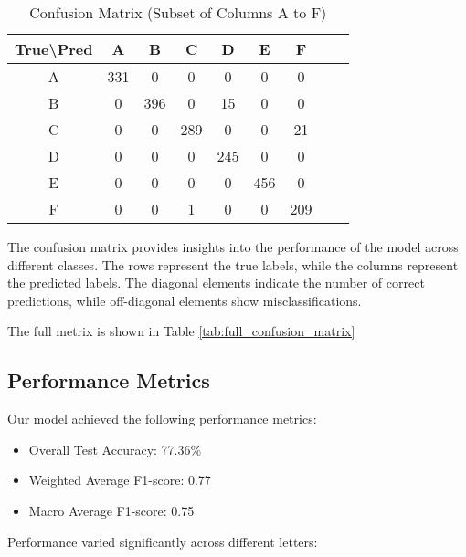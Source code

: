 \documentclass[times,final,english]{revdetua}
\begin{document}
\begin{table}[ht]
\centering
\caption{Confusion Matrix (Subset of Columns A to F)}
\label{tab:confusion_matrix_subset_0}
\begin{tabular}{|c|c|c|c|c|c|c|c|c|}
\hline
\textbf{True\textbackslash Pred} & A & B & C & D & E & F \\ \hline
A & 331 & 0 & 0 & 0 & 0 & 0 \\ \hline
B & 0 & 396 & 0 & 15 & 0 & 0 \\ \hline
C & 0 & 0 & 289 & 0 & 0 & 21 \\ \hline
D & 0 & 0 & 0 & 245 & 0 & 0 \\ \hline
E & 0 & 0 & 0 & 0 & 456 & 0 \\ \hline
F & 0 & 0 & 1 & 0 & 0 & 209 \\ \hline
\end{tabular}
\end{table}

The confusion matrix provides insights into the performance of the model across different classes. The rows represent the true labels, while the columns represent the predicted labels. The diagonal elements indicate the number of correct predictions, while off-diagonal elements show misclassifications.

The full metrix is shown in Table \ref{tab:full_confusion_matrix} 

\subsection{Performance Metrics}

Our model achieved the following performance metrics:

\begin{itemize}
    \item Overall Test Accuracy: 77.36\%
    \item Weighted Average F1-score: 0.77
    \item Macro Average F1-score: 0.75
\end{itemize}

Performance varied significantly across different letters:
\end{document}

